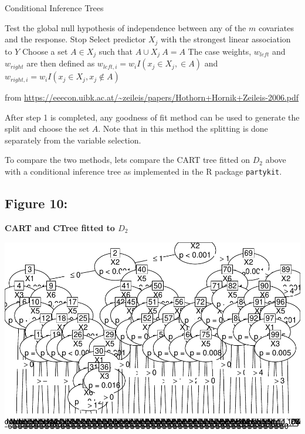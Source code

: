 \documentclass[12pt,twoside]{reedthesis}
\begin{document}
  \begin{algorithm}
  \caption{Conditional Inference Trees}
  \label{ctree}
  \begin{algorithmic}[1]
  \State Test the global null hypothesis of independence between any of the $m$ covariates and the response. 
  \State Stop 
  \Else \State Select predictor $X_j$ with the strongest linear association to $Y$ 
  \EndIf
  \State Choose a set $A \in X_j$ such that $A \cup X_j \ A = A$ 
  \State The case weights, $w_{left}$ and $w_{right}$ are then defined as $w_{left,i} = w_i I (x_j \in X_j, \in A)$ and $w_{right,i} = w_i I(x_j \in X_j, x_j \notin A)$
  \EndFor
  \end{algorithmic}
  \end{algorithm}
  
  from
  \url{https://eeecon.uibk.ac.at/~zeileis/papers/Hothorn+Hornik+Zeileis-2006.pdf}
  
  After step 1 is completed, any goodness of fit method can be used to
  generate the split and choose the set \(A\). Note that in this method
  the splitting is done separately from the variable selection.
  
  To compare the two methods, lets compare the CART tree fitted on \(D_2\)
  above with a conditional inference tree as implemented in the R package
  \texttt{partykit}.
  
  \subsection{Figure 10:}\label{figure-10}
  
  \textbf{CART and CTree fitted to \(D_2\)}
  
  \begin{center}\includegraphics{Thesis_files/figure-latex/fig10-1} \end{center}
  
\end{document}
